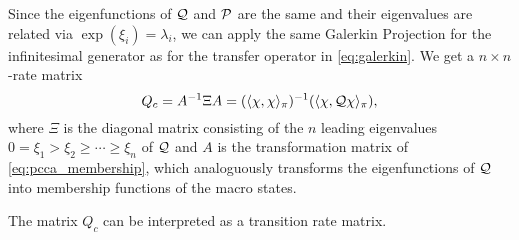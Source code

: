 Since the eigenfunctions of $\mathcal{Q}$ and $\mathcal{P}$ are the same and their eigenvalues are related via $\exp{(\xi_i)} = \lambda_i$, we can apply the same Galerkin Projection for the infinitesimal generator as for the transfer operator in \eqref{eq:galerkin}.
We get a $n\times n$-rate matrix
\begin{equation}
\label{eq:galerkin_infinitesimal}
Q_c = A^{-1} \Xi A = (\langle \chi, \chi \rangle_\pi)^{-1} (\langle \chi, \mathcal{Q} \chi \rangle_\pi),
\end{equation}
where $\Xi$ is the diagonal matrix consisting of the $n$ leading eigenvalues $0 = \xi_1 > \xi_2 \geq \cdots \geq \xi_n$ of $\mathcal{Q}$ and $A$ is the transformation matrix of \eqref{eq:pcca_membership}, which analoguously transforms the eigenfunctions of $\mathcal{Q}$ into membership functions of the macro states.

The matrix $Q_c$ can be interpreted as a transition rate matrix. 
\pagebreak